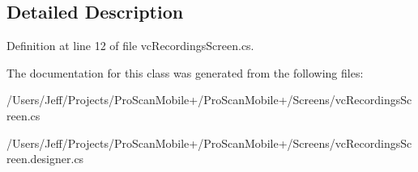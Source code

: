 \subsection{Detailed Description}


Definition at line 12 of file vc\-Recordings\-Screen.\-cs.



The documentation for this class was generated from the following files\-:\begin{DoxyCompactItemize}
\item 
/\-Users/\-Jeff/\-Projects/\-Pro\-Scan\-Mobile+/\-Pro\-Scan\-Mobile+/\-Screens/vc\-Recordings\-Screen.\-cs\item 
/\-Users/\-Jeff/\-Projects/\-Pro\-Scan\-Mobile+/\-Pro\-Scan\-Mobile+/\-Screens/vc\-Recordings\-Screen.\-designer.\-cs\end{DoxyCompactItemize}
